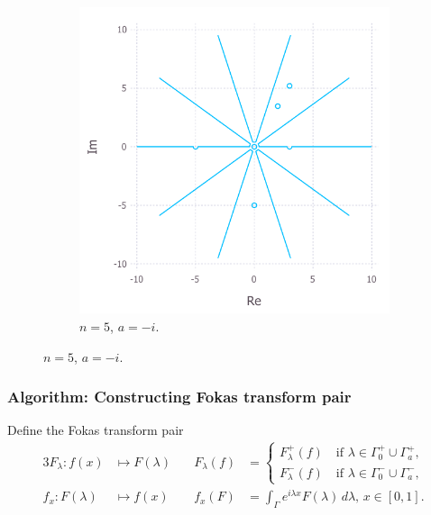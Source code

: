 \documentclass{beamer}
\begin{document}
\begin{frame}[t]
\begin{figure}
\begin{subfigure}{.45\textwidth}
            \includegraphics[width=1\linewidth]{contourPlot_n=5_a=-i_cropped.pdf}
            \caption{$n=5$, $a=-i$.}
        \end{subfigure}
    \end{figure}
\end{frame}

\begin{frame}
    \frametitle{Algorithm: Constructing Fokas transform pair}
    Define the Fokas transform pair
        \begin{alignat*}{3}
            F_\lambda: f(x)&\mapsto F(\lambda)\quad &F_\lambda(f) &= \begin{cases}F^+_\lambda(f)\quad\mbox{if $\lambda\in \Gamma_0^+\cup \Gamma_a^+$},\\F^-_\lambda(f)\quad\mbox{if $\lambda\in \Gamma_0^-\cup \Gamma_a^-$},\end{cases}\\
            f_x:F(\lambda)&\mapsto f(x)\quad &f_x(F) &= \int_\Gamma e^{i\lambda x} F(\lambda)\,d\lambda,\, x\in [0,1].
        \end{alignat*}
\end{frame}
\end{document}
